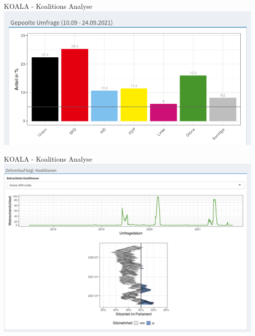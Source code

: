 \documentclass[
  10pt,
  ignorenonframetext,
]{beamer}
\begin{document}
\begin{frame}{KOALA - Koalitions Analyse}
\label{koala---koalitions-analyse-1}
\includegraphics{pics/koala_survey}
\end{frame}

\begin{frame}{KOALA - Koalitions Analyse}
\label{koala---koalitions-analyse-2}
\includegraphics{pics/koala_probs}
\end{frame}
\end{document}
